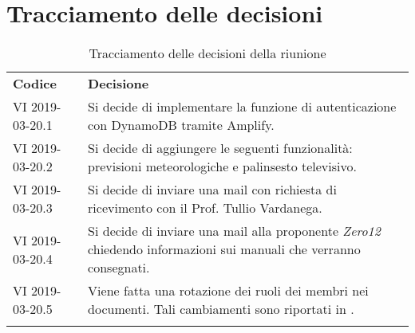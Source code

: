 \clearpage
\section{Tracciamento delle decisioni}
\begin{center}
	\renewcommand{\arraystretch}{1.5}
	\begin{longtable}{  p{2.8cm} p{11.4cm} }
		\rowcolor{tableHeadYellow}
		\textbf{Codice}&\textbf{Decisione}\\
		VI 2019-03-20.1 & Si decide di implementare la funzione di autenticazione con DynamoDB tramite Amplify.\\
		VI 2019-03-20.2 & Si decide di aggiungere le seguenti funzionalità: previsioni meteorologiche e palinsesto televisivo.\\
		VI 2019-03-20.3 & Si decide di inviare una mail con richiesta di ricevimento con il Prof. Tullio Vardanega.\\
		VI 2019-03-20.4 & Si decide di inviare una mail alla proponente \textit{Zero12} chiedendo informazioni sui manuali che verranno consegnati.\\
		VI 2019-03-20.5 & Viene fatta una rotazione dei ruoli dei membri nei documenti. Tali cambiamenti sono riportati in \addref{sec:rotazione}.\\
		\rowcolor{white}
		\caption{Tracciamento delle decisioni della riunione}
	\end{longtable}	
\end{center}
